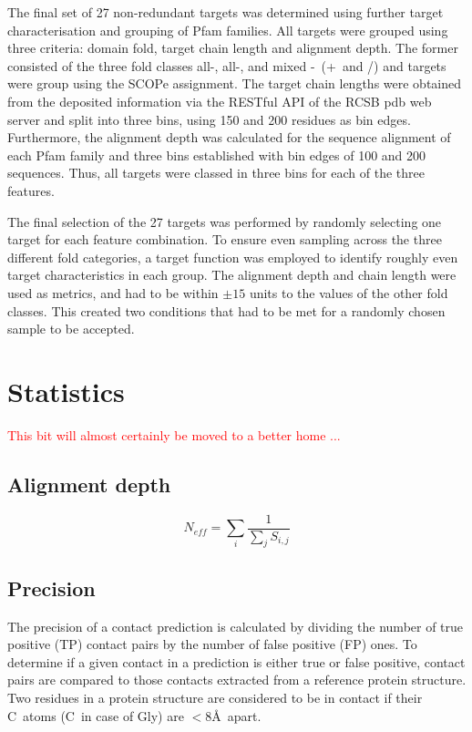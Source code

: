 The final set of 27 non-redundant targets was determined using further target characterisation and grouping of Pfam families. All targets were grouped using three criteria: domain fold, target chain length and alignment depth. The former consisted of the three fold classes all-\textalpha, all-\textbeta, and mixed \textalpha-\textbeta\ (\textalpha+\textbeta\ and \textalpha/\textbeta) and targets were group using the SCOPe assignment. The target chain lengths were obtained from the deposited information via the RESTful API of the RCSB \gls{pdb} web server and split into three bins, using 150 and 200 residues as bin edges. Furthermore, the alignment depth was calculated for the sequence alignment of each Pfam family and three bins established with bin edges of 100 and 200 sequences. Thus, all targets were classed in three bins for each of the three features. 

The final selection of the 27 targets was performed by randomly selecting one target for each feature combination. To ensure even sampling across the three different fold categories, a target function was employed to identify roughly even target characteristics in each group. The alignment depth and chain length were used as metrics, and had to be within $\pm15$ units to the values of the other fold classes. This created two conditions that had to be met for a randomly chosen sample to be accepted.


\section{Statistics}
\textcolor{red}{This bit will almost certainly be moved to a better home ...}
\subsection{Alignment depth} \label{sec:methods_alignment_depth}
\begin{equation} 
N_{eff}=\sum_{i}\frac{1}{\sum_{j}S_{i,j}}
\label{eq:methods_alignment_depth}
\end{equation}


\subsection{Precision} \label{sec:methods_precision}
The precision of a contact prediction is calculated by dividing the number of true positive (TP) contact pairs by the number of false positive (FP) ones. To determine if a given contact in a prediction is either true or false positive, contact pairs are compared to those contacts extracted from a reference protein structure. Two residues in a protein structure are considered to be in contact if their C\textbeta\ atoms (C\textalpha\ in case of Gly) are $<8$\AA\ apart.


